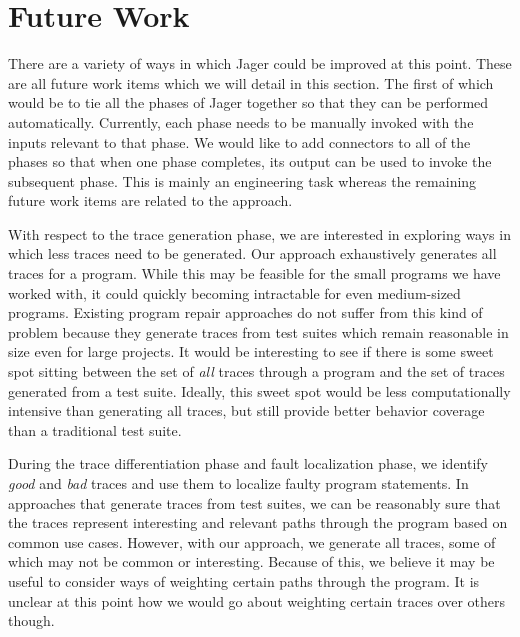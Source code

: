 \documentclass[]{article}
\begin{document}


\section{Future Work}

There are a variety of ways in which Jager could be improved at this point.
These are all future work items which we will detail in this section. The
first of which would be to tie all the phases of Jager together so that they
can be performed automatically. Currently, each phase needs to be manually
invoked with the inputs relevant to that phase. We would like to add
connectors to all of the phases so that when one phase completes, its output
can be used to invoke the subsequent phase. This is mainly an engineering
task whereas the remaining future work items are related to the approach.

With respect to the trace generation phase, we are interested in exploring
ways in which less traces need to be generated. Our approach exhaustively
generates all traces for a program. While this may be feasible for the small
programs we have worked with, it could quickly becoming intractable for even
medium-sized programs. Existing program repair approaches do not suffer from
this kind of problem because they generate traces from test suites which
remain reasonable in size even for large projects. It would be interesting to
see if there is some sweet spot sitting between the set of \emph{all} traces
through a program and the set of traces generated from a test suite.
Ideally, this sweet spot would be less computationally intensive than
generating all traces, but still provide better behavior coverage than a
traditional test suite.

During the trace differentiation phase and fault localization phase, we
identify \emph{good} and \emph{bad} traces and use them to localize faulty
program statements. In approaches that generate traces from test suites, we
can be reasonably sure that the traces represent interesting and relevant
paths through the program based on common use cases. However, with our
approach, we generate all traces, some of which may not be common or
interesting. Because of this, we believe it may be useful to consider ways
of weighting certain paths through the program. It is unclear at this point
how we would go about weighting certain traces over others though.
\end{document}
